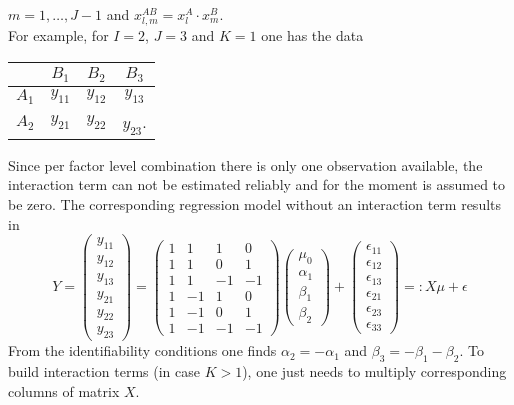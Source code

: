 \documentclass[12pt]{article}
\begin{document}
$m=1,\ldots,J-1$ and $x_{l,m}^{AB}=x_l^A\cdot x_m^B$.\\
For example, for $I=2$, $J=3$ and $K=1$ one has the data
\begin{center}
	\begin{tabular}{c|c|c|c}
		&$B_1$&$B_2$&$B_3$\\\hline
		$A_1$&$y_{11}$&$y_{12}$&$y_{13}$\\
		$A_2$&$y_{21}$&$y_{22}$&$y_{23}$.
	\end{tabular}
\end{center}
Since per factor level combination there is only one observation available, the interaction term can not be estimated reliably and for the moment is assumed to be zero. The corresponding regression model without an interaction term results in
$$
Y=\left(
\begin{matrix}
	y_{11}\\
	y_{12}\\
	y_{13}\\
	y_{21}\\
	y_{22}\\
	y_{23}
\end{matrix}
\right)=\left(
\begin{matrix}
	1&1&1&0\\
	1&1&0&1\\
	1&1&-1&-1\\
	1&-1&1&0\\
	1&-1&0&1\\
	1&-1&-1&-1
\end{matrix}
\right)\left(
\begin{matrix}
	\mu_0\\
	\alpha_1\\
	\beta_1\\
	\beta_2
\end{matrix}
\right)+\left(
\begin{matrix}
	\epsilon_{11}\\
	\epsilon_{12}\\
	\epsilon_{13}\\
	\epsilon_{21}\\
	\epsilon_{23}\\
	\epsilon_{33}
\end{matrix}
\right)=:X\mu+\epsilon
$$
From the identifiability conditions one finds $\alpha_2=-\alpha_1$ and $\beta_3=-\beta_1-\beta_2$. To build interaction terms (in case $K>1$), one just needs to multiply corresponding columns of matrix $X$.\\
\end{document}
